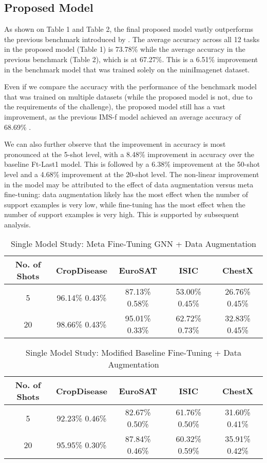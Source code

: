 \documentclass[10pt,twocolumn,letterpaper]{article}
\newcommand{\dtoprule}{\specialrule{1pt}{0pt}{0.4pt}\specialrule{0.3pt}{0pt}{\belowrulesep}}
\begin{document}
\subsection{Proposed Model}

As shown on Table 1 and Table 2, the final proposed model vastly outperforms the previous benchmark introduced by \cite{guo2019new}. The average accuracy across all 12 tasks in the proposed model (Table 1) is 73.78\% while the average accuracy in the previous benchmark (Table 2), which is at 67.27\%. This is a 6.51\% improvement in the benchmark model that was trained solely on the miniImagenet dataset.

Even if we compare the accuracy with the performance of the benchmark model that was trained on multiple datasets (while the proposed model is not, due to the requirements of the challenge), the proposed model still has a vast improvement, as the previous IMS-f model achieved an average accuracy of 68.69\% \cite{guo2019new}.

We can also further observe that the improvement in accuracy is most pronounced at the 5-shot level, with a 8.48\% improvement in accuracy over the baseline Ft-Last1 model. This is followed by a 6.38\% improvement at the 50-shot level and a 4.68\% improvement at the 20-shot level. The non-linear improvement in the model may be attributed to the effect of data augmentation versus meta fine-tuning: data augmentation likely has the most effect when the number of support examples is very low, while fine-tuning has the most effect when the number of support examples is very high. This is supported by subsequent analysis.

\begin{table*}[t]
  \centering
  \begin{tabular}{@{}ccccc@{}}
    \dtoprule
    No. of Shots  & CropDisease    & EuroSAT & ISIC & ChestX  \\
    \midrule
    5 & 96.14\%  0.43\% & 87.13\%  0.58\% & 53.00\%  0.45\%	& 26.76\%  0.45\% \\ 
    20 & 98.66\%  0.43\%	& 95.01\%  0.33\% & 62.72\%  0.73\% & 32.83\%  0.45\% \\
    \bottomrule
  \end{tabular}
  
  \caption{Single Model Study: Meta Fine-Tuning GNN + Data Augmentation}
\end{table*}

\begin{table*}[t]
  \centering
  \begin{tabular}{@{}ccccc@{}}
    \dtoprule
    No. of Shots  & CropDisease    & EuroSAT & ISIC & ChestX  \\
    \midrule
    5 &  92.23\%  0.46\% & 82.67\%  0.50\% & 61.76\%  0.50\% & 31.60\%  0.41\% \\
    20 & 95.95\%  0.30\% & 87.84\%  0.46\% & 60.32\%  0.59\% & 35.91\%  0.42\% \\ 
    \bottomrule
  \end{tabular}
  
  \caption{Single Model Study: Modified Baseline Fine-Tuning + Data Augmentation}
\end{table*}
\end{document}
